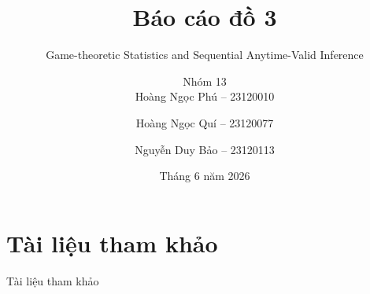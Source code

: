 \documentclass[handout]{beamer}
\author{
  Nhóm 13 \\
  Hoàng Ngọc Phú -- 23120010 \and
  Hoàng Ngọc Quí -- 23120077 \and
  Nguyễn Duy Bảo -- 23120113
}
\title{Báo cáo đồ 3}
\subtitle{Game-theoretic Statistics and Sequential Anytime-Valid Inference}
\date{Tháng 6 năm 2026}
\begin{document}
\begin{frame}[plain]
  \titlepage
\end{frame}




\section*{Tài liệu tham khảo}

\begin{frame}{Tài liệu tham khảo}
  \nocite{*}
  
  
\end{frame}
\end{document}
